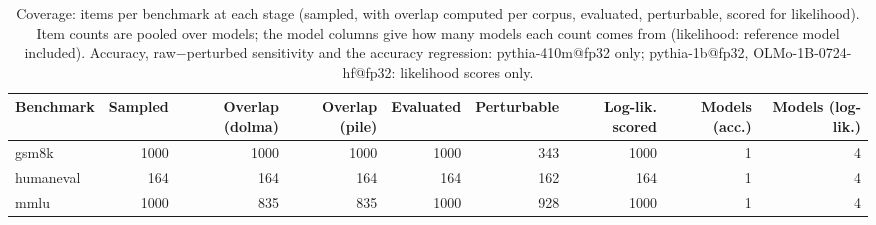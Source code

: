 \begin{table}[t]
\centering
\caption{Coverage: items per benchmark at each stage (sampled, with overlap computed per corpus, evaluated, perturbable, scored for likelihood). Item counts are pooled over models; the model columns give how many models each count comes from (likelihood: reference model included). Accuracy, raw$-$perturbed sensitivity and the accuracy regression: pythia-410m@fp32 only; pythia-1b@fp32, OLMo-1B-0724-hf@fp32: likelihood scores only. }
\label{tab:coverage}
\begin{tabular}{lrrrrrrrr}
\toprule
Benchmark & Sampled & Overlap (dolma) & Overlap (pile) & Evaluated & Perturbable & Log-lik. scored & Models (acc.) & Models (log-lik.) \\
\midrule
gsm8k & 1000 & 1000 & 1000 & 1000 & 343 & 1000 & 1 & 4 \\
\midrule
humaneval & 164 & 164 & 164 & 164 & 162 & 164 & 1 & 4 \\
\midrule
mmlu & 1000 & 835 & 835 & 1000 & 928 & 1000 & 1 & 4 \\
\bottomrule
\end{tabular}
\end{table}
